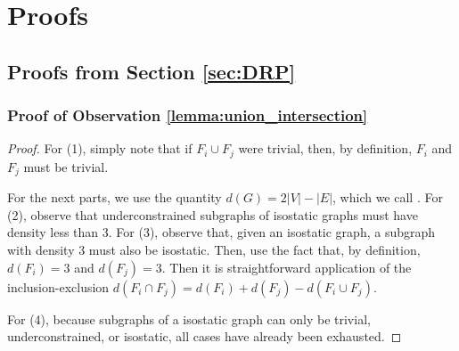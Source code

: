 \newcommand{\faninx}[1]{\textsc{FanIn}(#1)}
\newcommand{\faninxy}[2]{\textsc{FanIn}_{#1}(#2)}
\newcommand{\numberofleavesx}[1]{\textsc{NL}(#1)}
\newcommand{\numberofparametersx}[1]{\textsc{NP}(#1)}
\newcommand{\numberofchildrenxy}[2]{\textsc{NC}_{#1}(#2)}


\section{Proofs}
\label{sec:appendix:a}
\label{sec:appendix:proofs}

\subsection{Proofs from Section \ref{sec:DRP}}









\subsubsection{Proof of Observation \ref{lemma:union_intersection}}

\begin{proof}
    For (1), simply note that if $F_i\cup F_j$ were trivial, then, by definition, $F_i$ and $F_j$ must be trivial.

    For the next parts, we use the quantity $d(G)=2|V|-|E|$, which we call .
    For (2), observe that underconstrained subgraphs of isostatic graphs must have density less than 3.
    For (3), observe that, given an isostatic graph, a subgraph with density $3$ must also be isostatic. Then, use the fact that, by definition, $d(F_i)=3$ and $d(F_j)=3$. Then it is straightforward application of the inclusion-exclusion $d(F_i\cap F_j)=d(F_i)+d(F_j)-d(F_i\cup F_j)$.

    For (4), because subgraphs of a isostatic graph can only be trivial, underconstrained, or isostatic, all cases have already been exhausted.
\end{proof}



